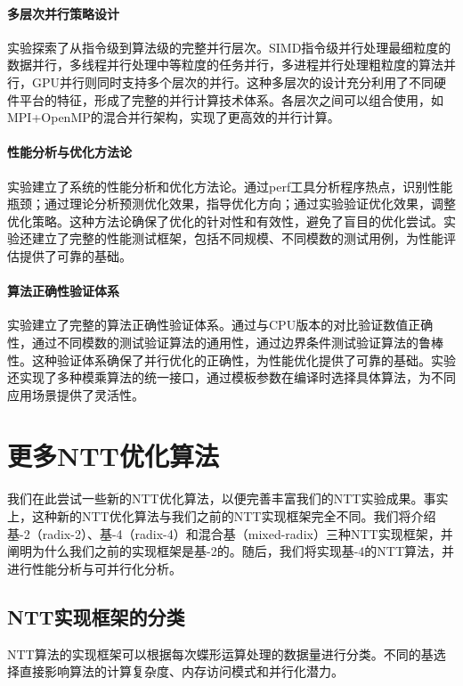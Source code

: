 \documentclass[a4paper]{article}
\begin{document}
\paragraph{多层次并行策略设计} 实验探索了从指令级到算法级的完整并行层次。SIMD指令级并行处理最细粒度的数据并行，多线程并行处理中等粒度的任务并行，多进程并行处理粗粒度的算法并行，GPU并行则同时支持多个层次的并行。这种多层次的设计充分利用了不同硬件平台的特征，形成了完整的并行计算技术体系。各层次之间可以组合使用，如MPI+OpenMP的混合并行架构，实现了更高效的并行计算。

\paragraph{性能分析与优化方法论} 实验建立了系统的性能分析和优化方法论。通过perf工具分析程序热点，识别性能瓶颈；通过理论分析预测优化效果，指导优化方向；通过实验验证优化效果，调整优化策略。这种方法论确保了优化的针对性和有效性，避免了盲目的优化尝试。实验还建立了完整的性能测试框架，包括不同规模、不同模数的测试用例，为性能评估提供了可靠的基础。

\paragraph{算法正确性验证体系} 实验建立了完整的算法正确性验证体系。通过与CPU版本的对比验证数值正确性，通过不同模数的测试验证算法的通用性，通过边界条件测试验证算法的鲁棒性。这种验证体系确保了并行优化的正确性，为性能优化提供了可靠的基础。实验还实现了多种模乘算法的统一接口，通过模板参数在编译时选择具体算法，为不同应用场景提供了灵活性。

\section{更多NTT优化算法}

我们在此尝试一些新的NTT优化算法，以便完善丰富我们的NTT实验成果。事实上，这种新的NTT优化算法与我们之前的NTT实现框架完全不同。我们将介绍基-2（radix-2）、基-4（radix-4）和混合基（mixed-radix）三种NTT实现框架，并阐明为什么我们之前的实现框架是基-2的。随后，我们将实现基-4的NTT算法，并进行性能分析与可并行化分析。

\subsection{NTT实现框架的分类}

NTT算法的实现框架可以根据每次蝶形运算处理的数据量进行分类。不同的基选择直接影响算法的计算复杂度、内存访问模式和并行化潜力。
\end{document}
